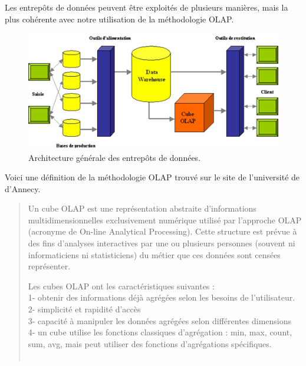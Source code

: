 \documentclass[a4paper,11pt]{report}
\begin{document}
\normalsize{
Les entrepôts de données peuvent être exploités de plusieurs manières, mais la plus cohérente avec notre utilisation de la méthodologie OLAP.
}

\begin{figure}[h]
   \begin{center}
   \includegraphics[scale =1.0]{architecture_general.png}
   \end{center}
  \caption{Architecture générale des entrepôts de données.}
\end{figure}

\vspace{0.5cm}
\normalsize{
Voici une définition de la méthodologie OLAP trouvé sur le site de l'université de d'Annecy. \\
}

\begin{quote}
Un cube OLAP est une représentation abstraite d'informations multidimensionnelles exclusivement numérique utilisé par l'approche OLAP (acronyme de On-line Analytical Processing). Cette structure est prévue à des fins d'analyses interactives par une ou plusieurs personnes (souvent ni informaticiens ni statisticiens) du métier que ces données sont censées représenter. 

Les cubes OLAP ont les caractéristiques suivantes : \\

1- obtenir des informations déjà agrégées selon les besoins de l’utilisateur.\\
2- simplicité et rapidité d’accès\\
3- capacité à manipuler les données agrégées selon différentes dimensions\\
4- un cube utilise les fonctions classiques d’agrégation : min, max, count, sum, avg, mais peut utiliser des fonctions d’agrégations spécifiques.\\ \\
\end{quote}
\end{document}
